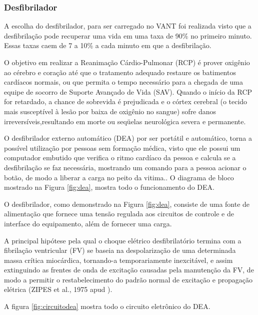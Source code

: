\subsubsection{Desfibrilador}

A escolha do desfibrilador, para ser carregado no VANT foi realizada visto que a desfibrilação pode recuperar uma vida
em uma taxa de 90\% no primeiro minuto. Essas taxas caem de 7 a 10\% a cada minuto em que a desfibrilação. \cite{1}

O objetivo em realizar a Reanimação Cárdio-Pulmonar (RCP) é prover oxigênio ao cérebro e coração até que
o tratamento adequado restaure os batimentos cardíacos normais, ou que permita o tempo necessário para a 
chegada de uma equipe de socorro de Suporte Avançado de Vida (SAV). Quando o início da RCP for retardado, 
a chance de sobrevida é prejudicada e o córtex cerebral (o tecido mais susceptível à lesão por baixa de 
oxigênio no sangue) sofre danos irreversíveis,resultando em morte ou seqüelas neurológica severa e permanente. \cite{2}

O desfibrilador externo automático (DEA) por ser portátil e automático, torna a possível utilização por 
pessoas sem formação médica, visto que ele possui um computador embutido que verifica o ritmo cardíaco da 
pessoa e calcula se a desfibrilação se faz necessária, mostrando um comando para a pessoa acionar o botão, de 
modo a liberar a carga no peito da vitima.\cite{3}. O diagrama de bloco mostrado na Figura \ref{fig:dea}, mostra todo o funcionamento do DEA.


O desfibrilador, como demonstrado na Figura \ref{fig:dea}, consiste de uma fonte  de alimentação que 
fornece uma tensão regulada aos circuitos de controle e de interface do equipamento, além de fornecer uma carga.

A principal hipótese pela qual o choque elétrico desfibrilatório termina com a fibrilação ventricular (FV) se
baseia na despolarização de uma determinada massa crítica miocárdica, tornando-a temporariamente inexcitável, e
assim extinguindo as frentes de onda de excitação causadas pela manutenção da FV, de modo a permitir o 
restabelecimento do padrão normal de excitação e propagação elétrica (ZIPES et al., 1975 apud ).

A figura \ref{fig:circuitodea} mostra todo o circuito eletrônico do DEA.

